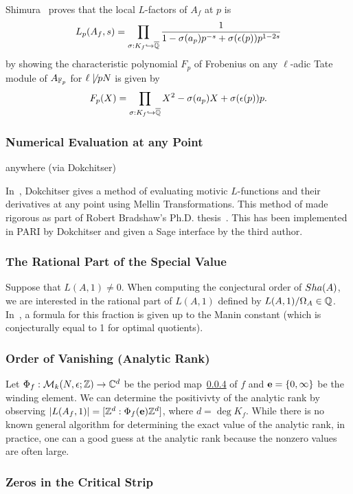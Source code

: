 \documentclass{article}
\begin{document}
Shimura~\cite{shimura:introduction} proves that the local $L$-factors of $A_f$ at $p$
is 
\[
    L_p(A_f, s) = 
    \prod_{\sigma:K_f\hookrightarrow \overline{\mathbb{Q}}} 
    \frac{1}
    {1-\sigma(a_p)p^{-s}+\sigma(\epsilon(p)) p ^{1-2s}}
\]
by showing the characteristic polynomial $F_p$ of Frobenius on any $\ell$-adic
Tate module of $A_{\mathbb{F}_p}$ for $\ell\not\mid pN$ is given by
\[
    F_p(X) =
    \prod_{\sigma:K_f\hookrightarrow \overline{\mathbb{Q}}} 
    X^2 - \sigma(a_p) X + \sigma(\epsilon(p))p.
\]



\subsubsection{Numerical Evaluation at any Point}
anywhere (via Dokchitser)

In~\cite{dokchitser:function}, Dokchitser gives a method of evaluating motivic
$L$-functions and their derivatives at any point using Mellin Transformations.
This method of made rigorous as part of Robert Bradshaw's Ph.D.
thesis~\cite{bradshaw:provable}. This has been implemented in PARI by Dokchitser and
given a Sage interface by the third author.

\subsubsection{The Rational Part of the Special Value}

Suppose that $L(A,1)\neq 0$. When computing the conjectural order of $Sha(A)$,
we are interested in the rational part of $L(A, 1)$ defined by $L(A,
1)/\Omega_A\in \mathbb{Q}$. In~\cite{agashe-stein:bsd}, a formula for this fraction is
given up to the Manin constant (which is conjecturally equal to 1 for optimal
quotients).  

\subsubsection{Order of Vanishing (Analytic Rank)}

Let $\Phi_f:\mathcal{M}_k(N, \epsilon; \mathbb{Z})\to \mathbb{C}^d$ be the period map~\ref{} of
$f$ and $\mathbf{e}=\{0,\infty\}$ be the winding element. We can determine the
positivivty of the analytic rank by observing $|L(A_f, 1)| = [\mathbb{Z}^d:
\Phi_f(\mathbf{e})\mathbb{Z}^d]$, where $d=\deg K_f$. While there is no known general
algorithm for determining the exact value of the analytic rank, in practice,
one can a good guess at the analytic rank because the nonzero values are often
large.

\subsubsection{Zeros in the Critical Strip}
\end{document}
